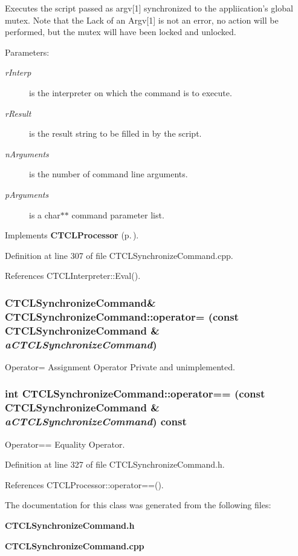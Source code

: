 Executes the script passed as argv[1] synchronized to the appliication's global mutex. Note that the Lack of an Argv[1] is not an error, no action will be performed, but the mutex will have been locked and unlocked.\begin{Desc}
\item[Parameters: ]\par
\begin{description}
\item[{\em 
r\-Interp}]is the interpreter on which the command is to execute. \item[{\em 
r\-Result}]is the result string to be filled in by the script. \item[{\em 
n\-Arguments}]is the number of command line arguments. \item[{\em 
p\-Arguments}]is a char$\ast$$\ast$ command parameter list. \end{description}
\end{Desc}


Implements {\bf CTCLProcessor} {\rm (p.\,\pageref{classCTCLProcessor_a7})}.

Definition at line 307 of file CTCLSynchronize\-Command.cpp.

References CTCLInterpreter::Eval().
\subsubsection{\setlength{\rightskip}{0pt plus 5cm}CTCLSynchronize\-Command\& CTCLSynchronize\-Command::operator= (const CTCLSynchronize\-Command \& {\em a\-CTCLSynchronize\-Command})\hspace{0.3cm}{\tt  [private]}}\label{classCTCLSynchronizeCommand_c1}


Operator= Assignment Operator Private and unimplemented.

\subsubsection{\setlength{\rightskip}{0pt plus 5cm}int CTCLSynchronize\-Command::operator== (const CTCLSynchronize\-Command \& {\em a\-CTCLSynchronize\-Command}) const\hspace{0.3cm}{\tt  [inline]}}\label{classCTCLSynchronizeCommand_a2}


Operator== Equality Operator.



Definition at line 327 of file CTCLSynchronize\-Command.h.

References CTCLProcessor::operator==().

The documentation for this class was generated from the following files:\begin{CompactItemize}
\item 
{\bf CTCLSynchronize\-Command.h}\item 
{\bf CTCLSynchronize\-Command.cpp}\end{CompactItemize}
